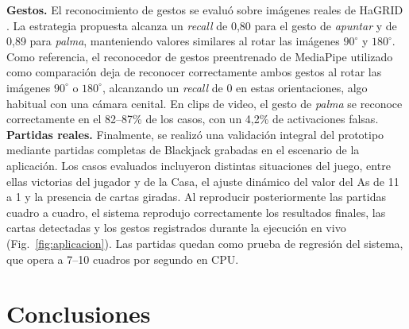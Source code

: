 \documentclass[conference,a4paper]{IEEEtran}
\begin{document}
\textbf{Gestos.} El reconocimiento de gestos se evaluó sobre imágenes reales de HaGRID \cite{kapitanov2024hagrid}. La estrategia propuesta alcanza un \emph{recall} de 0,80 para el gesto de \emph{apuntar} y de 0,89 para \emph{palma}, manteniendo valores similares al rotar las imágenes $90^\circ$ y $180^\circ$. Como referencia, el reconocedor de gestos preentrenado de MediaPipe utilizado como comparación deja de reconocer correctamente ambos gestos al rotar las imágenes $90^\circ$ o $180^\circ$, alcanzando un \emph{recall} de 0 en estas orientaciones, algo habitual con una cámara cenital. En clips de video, el gesto de \emph{palma} se reconoce correctamente en el 82--87\% de los casos, con un 4,2\% de activaciones falsas.
\textbf{Partidas reales.} Finalmente, se realizó una validación integral del prototipo mediante partidas completas de Blackjack grabadas en el escenario de la aplicación. Los casos evaluados incluyeron distintas situaciones del juego, entre ellas victorias del jugador y de la Casa, el ajuste dinámico del valor del As de 11 a 1 y la presencia de cartas giradas. Al reproducir posteriormente las partidas cuadro a cuadro, el sistema reprodujo correctamente los resultados finales, las cartas detectadas y los gestos registrados durante la ejecución en vivo (Fig.~\ref{fig:aplicacion}). Las partidas quedan como prueba de regresión del sistema, que opera a 7--10 cuadros por segundo en CPU.

\section{Conclusiones}
\end{document}
